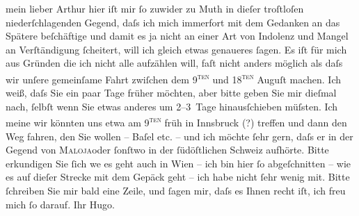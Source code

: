 \pstart{}mein lieber Arthur\pend\vspace{0.5em}
\pstart
           hier iſt mir{ }ſo zuwider zu Muth in dieſer troſtloſen niederſchlagenden Gegend, daſs
               ich mich immerfort mit dem Gedanken an das Spätere beſchäftige und damit es ja nicht
               an einer Art von Indolenz und Mangel an Verſtändigung{ }ſcheitert, will ich gleich
               etwas genaueres{ }ſagen. Es iſt {\pb}für
               mich aus Gründen die ich nicht alle aufzählen will, faſt nicht anders möglich als
               daſs wir unſere gemeinſame Fahrt zwiſchen dem 9\textsc{\textsuperscript{ten}} und 18\textsc{\textsuperscript{ten}} Auguſt machen. Ich weiß, daſs Sie ein paar Tage früher möchten, aber
               bitte geben Sie mir dieſmal {\pb}nach,{ }ſelbſt wenn Sie etwas anderes um 2–3 Tage hinausſchieben müſsten. Ich meine wir
               könnten uns etwa am 9\textsc{\textsuperscript{ten}} früh in Innsbruck (?) treffen und dann den
               Weg fahren, den Sie wollen – Baſel etc. – und ich
               möchte{ }ſehr gern, daſs er in der Gegend von \textsc{Maloja}oder{ }ſonſtwo in der{ }ſüdöſtlichen
                  Schweiz aufhörte. Bitte erkundigen Sie{ }ſich
                  we{\geminationn} es geht auch in Wien – ich bin hier{ }ſo abgeſchnitten – wie es auf dieſer Strecke mit dem
               Gepäck geht – ich habe nicht{ }ſehr wenig mit. Bitte{ }ſchreiben Sie mir bald eine Zeile,
               und{ }ſagen mir, daſs es Ihnen recht iſt, ich freu mich{ }ſo darauf. Ihr
                  \spacefill\mbox{Hugo.}\pend
           \endnumbering{}  \newcommand{\dateiname}{L00810}\newcommand{\titel}{Hugo von Hofmannsthal an Arthur Schnitzler, 2. 7. [1898]}\newcommand{\editorInnen}{Martin Anton Müller und Gerd-Hermann Susen}

